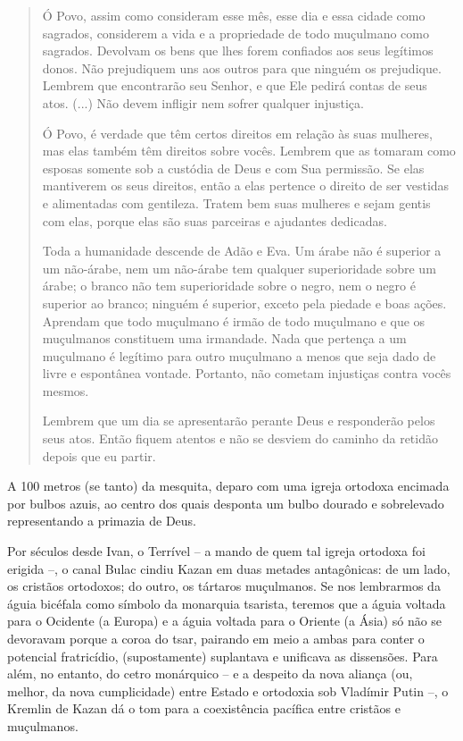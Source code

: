 \begin{quote}
Ó Povo, assim como consideram esse mês, esse dia e essa cidade como
sagrados, considerem a vida e a propriedade de todo muçulmano como
sagrados. Devolvam os bens que lhes forem confiados aos seus legítimos
donos. Não prejudiquem uns aos outros para que ninguém os prejudique.
Lembrem que encontrarão seu Senhor, e que Ele pedirá contas de seus
atos. (...) Não devem infligir nem sofrer qualquer injustiça.

Ó Povo, é verdade que têm certos direitos em relação às suas mulheres,
mas elas também têm direitos sobre vocês. Lembrem que as tomaram como
esposas somente sob a custódia de Deus e com Sua permissão. Se elas
mantiverem os seus direitos, então a elas pertence o direito de ser
vestidas e alimentadas com gentileza. Tratem bem suas mulheres e sejam
gentis com elas, porque elas são suas parceiras e ajudantes dedicadas.

Toda a humanidade descende de Adão e Eva. Um árabe não é superior a um
não-árabe, nem um não-árabe tem qualquer superioridade sobre um árabe; o
branco não tem superioridade sobre o negro, nem o negro é superior ao
branco; ninguém é superior, exceto pela piedade e boas ações. Aprendam
que todo muçulmano é irmão de todo muçulmano e que os muçulmanos
constituem uma irmandade. Nada que pertença a um muçulmano é legítimo
para outro muçulmano a menos que seja dado de livre e espontânea
vontade. Portanto, não cometam injustiças contra vocês mesmos.

Lembrem que um dia se apresentarão perante Deus e responderão pelos seus
atos. Então fiquem atentos e não se desviem do caminho da retidão depois
que eu partir.
\end{quote}

A 100 metros (se tanto) da mesquita, deparo com uma igreja ortodoxa
encimada por bulbos azuis, ao centro dos quais desponta um bulbo dourado
e sobrelevado representando a primazia de Deus.

Por séculos desde Ivan, o Terrível -- a mando de quem tal igreja
ortodoxa foi erigida --, o canal Bulac cindiu Kazan em duas metades
antagônicas: de um lado, os cristãos ortodoxos; do outro, os tártaros
muçulmanos. Se nos lembrarmos da águia bicéfala como símbolo da
monarquia tsarista, teremos que a águia voltada para o Ocidente (a
Europa) e a águia voltada para o Oriente (a Ásia) só não se devoravam
porque a coroa do tsar, pairando em meio a ambas para conter o potencial
fratricídio, (supostamente) suplantava e unificava as dissensões. Para
além, no entanto, do cetro monárquico -- e a despeito da nova aliança
(ou, melhor, da nova cumplicidade) entre Estado e ortodoxia sob Vladímir
Putin --, o Kremlin de Kazan dá o tom para a coexistência pacífica entre
cristãos e muçulmanos.

